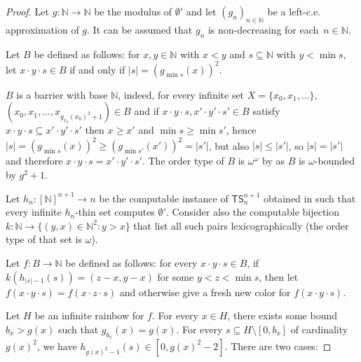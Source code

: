 \documentclass{article}
\newcommand{\TS}[0]{\mathsf{TS}}
\newcommand{\NN}[0]{\mathbb{N}}
\numberwithin{theorem}{section}
\newtheorem{proposition}[theorem]{Proposition}
\begin{document}
\begin{proof}
Let $g : \NN \to \NN$ be the modulus of $\emptyset'$ and let $(g_n)_{n \in \NN}$ be a left-c.e. approximation of $g$. It can be assumed that $g_n$ is non-decreasing for each~$n \in \NN$.

Let $B$ be defined as follows: for $x,y \in \NN$ with $x < y$ and $s \subseteq \NN$ with $y < \min s$, let $x \cdot y \cdot s \in B$ if and only if $|s| = (g_{\min s}(x))^2$.

$B$ is a barrier with base $\NN$, indeed, for every infinite set $X = \{x_0,x_1, \dots\}$, $(x_0,x_1, \dots, x_{g_{x_2}(x_0)^2 + 1}) \in B$ and if $x \cdot y \cdot s, x' \cdot y' \cdot s' \in B$ satisfy $x \cdot y \cdot s \subseteq x'\cdot y' \cdot s'$ then $x \geq x'$ and $\min s \geq \min s'$, hence $|s| = (g_{\min s}(x))^2 \geq (g_{\min s'}(x'))^2 = |s'|$, but also $|s| \leq |s'|$, so $|s| = |s'|$ and therefore $x \cdot y \cdot s = x'\cdot y' \cdot s'$. The order type of $B$ is $\omega^{\omega}$ by  as $B$ is $\omega$-bounded by $g^2 + 1$.

Let $h_n : [\NN]^{n+1} \to n$ be the computable instance of $\TS^{n+1}_n$ obtained in  such that every infinite $h_n$-thin set computes $\emptyset'$. Consider also the computable bijection $k : \NN \to \{(y,x) \in \NN^2 : y > x\}$ that list all such pairs lexicographically (the order type of that set is $\omega$).

Let $f : B \to \NN$ be defined as follows: for every $x \cdot y \cdot s \in B$, if $k(h_{|s| - 1}(s)) = (z - x, y - x)$ for some $y < z < \min s$, then let $f(x \cdot y \cdot s) = f(x \cdot z \cdot s)$ and otherwise give a fresh new color for $f(x \cdot y \cdot s)$.

Let $H$ be an infinite rainbow for $f$. For every $x \in H$, there exists some bound $b_x > g(x)$ such that $g_{b_x}(x) = g(x)$. For every $s \subseteq H \setminus [0,b_x]$ of cardinality $g(x)^2$, we have $h_{g(x)^2 - 1}(s) \in [0, g(x)^2 - 2]$. There are two cases:


\end{proof}
\end{document}
